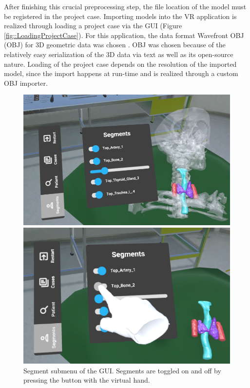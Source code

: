 After finishing this crucial preprocessing step, the file location of the model must be registered in the project case.
Importing models into the VR application is realized through loading a project case via the GUI (Figure \ref{fig::LoadingProjectCase}).
For this application, the data format Wavefront OBJ (OBJ) for 3D geometric data was chosen \cite{WavefrontOBJ}.
OBJ was chosen because of the relatively easy serialization of the 3D data via text as well as its open-source nature. 
Loading of the project case depends on the resolution of the imported model, since the import happens at run-time and is realized through a custom OBJ importer. 

\begin{figure}[ht]
  \centering
  \begin{minipage}{.5\textwidth}
    \centering
    \includegraphics[width=0.99\linewidth]{images/implementation/features/visualization/segments_1.png}
  \end{minipage}%
  \begin{minipage}{.5\textwidth}
    \centering
    \includegraphics[width=0.99\linewidth]{images/implementation/features/visualization/segments_2.png}
  \end{minipage}
  \caption{\label{fig::Segmentation}Segment submenu of the GUI. Segments are toggled on and off by pressing the button with the virtual hand.}
\end{figure}

